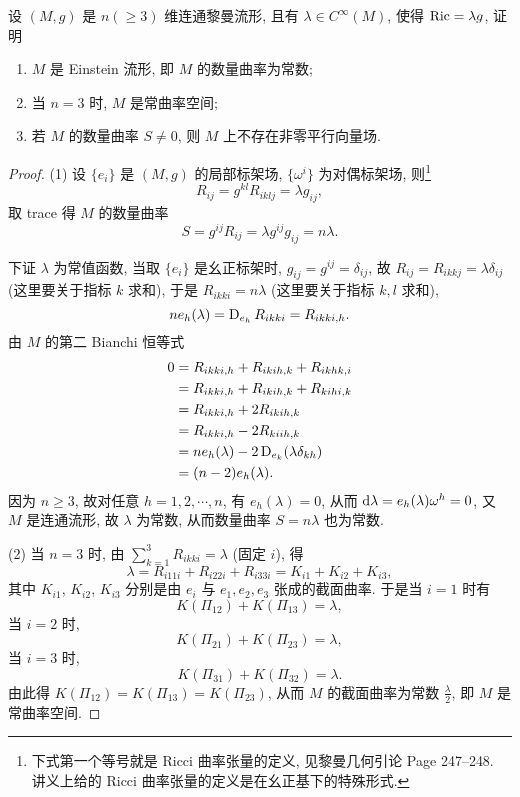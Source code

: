 \begin{exercise}
  设 $(M,g)$ 是 $n(\geq 3)$ 维连通黎曼流形, 且有 $\lambda\in C^{\infty}(M)$, 使得
  $\operatorname{Ric} = \lambda g$, 证明
  \begin{enumerate}[(1)]
    \item $M$ 是 Einstein 流形, 即 $M$ 的数量曲率为常数;
    \item 当 $n=3$ 时, $M$ 是常曲率空间;
    \item 若 $M$ 的数量曲率 $S\neq 0$, 则 $M$ 上不存在非零平行向量场.
  \end{enumerate}
\end{exercise}

\begin{proof}
  (1) 设 $\{e_i\}$ 是 $(M,g)$ 的局部标架场, $\{\omega^i\}$
  为对偶标架场, 则\footnote{下式第一个等号就是 Ricci 曲率张量的定义,
  见黎曼几何引论 Page 247--248. 讲义上给的 Ricci 曲率张量的定义是在幺正基下的特殊形式.}
  \[R_{ij} = g^{kl}R_{iklj} = \lambda g_{ij},\]
  取 trace 得 $M$ 的数量曲率
  \[S = g^{ij}R_{ij} = \lambda g^{ij}g_{ij} = n\lambda.\]

  下证 $\lambda$ 为常值函数, 当取 $\{e_i\}$ 是幺正标架时, $g_{ij}=g^{ij}=\delta_{ij}$,
  故 $R_{ij}=R_{ikkj}=\lambda\delta_{ij}$ (这里要关于指标 $k$ 求和),
  于是 $R_{ikki}=n\lambda$ (这里要关于指标 $k,l$ 求和),
  \[n e_h(\lambda) = \operatorname{D}_{e_h} R_{ikki} = R_{ikki,h}.\]
  由 $M$ 的第二 Bianchi 恒等式
  \begin{align*}
    0
    & = R_{ikki,h} + R_{ikih,k} + R_{ikhk,i} \\
    & = R_{ikki,h} + R_{ikih,k} + R_{kihi,k} \\
    & = R_{ikki,h} + 2R_{ikih,k} \\
    & = R_{ikki,h} - 2R_{kiih,k} \\
    & = n e_h(\lambda) - 2\operatorname{D}_{e_k}(\lambda\delta_{kh}) \\
    & = (n-2)e_h(\lambda).
  \end{align*}
  因为 $n\geq 3$, 故对任意 $h=1,2,\cdots,n$, 有 $e_h(\lambda)=0$,
  从而 $\mathop{}\!\mathrm{d}\lambda = e_h(\lambda)\omega^h=0$,
  又 $M$ 是连通流形, 故 $\lambda$ 为常数, 从而数量曲率 $S=n\lambda$ 也为常数.

  (2) 当 $n=3$ 时, 由 $\sum_{k=1}^3 R_{ikki}=\lambda$ (固定 $i$), 得
  \[\lambda = R_{i11i}+R_{i22i}+R_{i33i} = K_{i1}+K_{i2}+K_{i3},\]
  其中 $K_{i1}$, $K_{i2}$, $K_{i3}$ 分别是由 $e_i$ 与 $e_1,e_2,e_3$
  张成的截面曲率. 于是当 $i=1$ 时有
  \[K(\Pi_{12}) + K(\Pi_{13}) = \lambda,\]
  当 $i=2$ 时,
  \[K(\Pi_{21}) + K(\Pi_{23}) = \lambda,\]
  当 $i=3$ 时,
  \[K(\Pi_{31}) + K(\Pi_{32}) = \lambda.\]
  由此得 $K(\Pi_{12}) = K(\Pi_{13}) = K(\Pi_{23})$,
  从而 $M$ 的截面曲率为常数 $\frac{\lambda}{2}$, 即 $M$ 是常曲率空间.


\end{proof}
